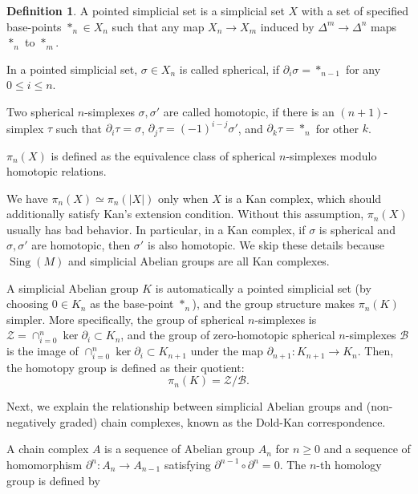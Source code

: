 \documentclass[reprint, amsmath, amssymb, showpacs, floatfix, longbibliography, aps, twocolumn, superscriptaddress, nofootinbib]{revtex4-2}
\theoremstyle{definition}
\newtheorem{definition}{Definition}[section]
\begin{document}
\begin{definition}
	A pointed simplicial set is a simplicial set $X$ with a set of specified base-points $*_n\in X_n$ such that any map $X_n\rightarrow X_m$ induced by $\Delta^m\rightarrow \Delta^n$ maps $*_n$ to $*_m$. 
	
	In a pointed simplicial set, $\sigma\in X_n$ is called spherical, if $\partial_i\sigma=*_{n-1}$ for any $0\le i\le n$.
	
	Two spherical $n$-simplexes $\sigma,\sigma'$ are called homotopic, if there is an $(n+1)$-simplex $\tau$ such that $\partial_{i}\tau=\sigma$, $\partial_{j}\tau=(-1)^{i-j}\sigma'$, and $\partial_k\tau=*_n$ for other $k$.
	
	$\pi_n(X)$ is defined as the equivalence class of spherical $n$-simplexes modulo homotopic relations.
	
\end{definition}

We have $\pi_n(X)\simeq \pi_n(|X|)$ only when $X$ is a Kan complex, which should additionally satisfy Kan's extension condition. Without this assumption, $\pi_n(X)$ usually has bad behavior. In particular, in a Kan complex, if $\sigma$ is spherical and $\sigma,\sigma'$ are homotopic, then $\sigma'$ is also homotopic.
We skip these details because $\operatorname{Sing}(M)$ and simplicial Abelian groups are all Kan complexes. 

A simplicial Abelian group $K$ is automatically a pointed simplicial set (by choosing $0\in K_n$ as the base-point $*_n$), and the group structure makes $\pi_n(K)$ simpler. More specifically, the group of spherical $n$-simplexes is
$
	\mathcal{Z}=\cap_{i=0}^n \ker \partial_i\subset K_n$, and the group of zero-homotopic spherical $n$-simplexes $\mathcal{B}$ is the image of $\cap_{i=0}^n \ker \partial_i\subset K_{n+1}$ under the map $\partial_{n+1}:K_{n+1}\rightarrow K_n$.
Then, the homotopy group is defined as their quotient:
\begin{equation}
	\pi_n(K)=\mathcal{Z}/\mathcal{B}.
\end{equation}

Next, we explain the relationship between simplicial Abelian groups and (non-negatively graded) chain complexes, known as the Dold-Kan correspondence.

A chain complex $A$ is a sequence of Abelian group $A_n$ for $n\ge 0$ and a sequence of homomorphism $\partial^n:A_n\rightarrow A_{n-1}$ satisfying $\partial^{n-1}\circ \partial^n=0$. The $n$-th homology group is defined by
\end{document}
